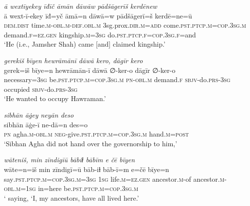 \ea \label{DP.17}
\textit{ā wextīyekey īđīč āmān dāwāw pādšāgerīš kerdēnew} \\ 
\gll ā wext-ī-ekey īđ=yč āmā=n dāwā=w pādšāgerī=š kerdē=ne=ū \\ 
 \textsc{dem.dist} time\textsc{.m}\textsc{-obl}\textsc{.m}\textsc{-def}\textsc{.obl}\textsc{.m} 3sg.prox\textsc{.dir}\textsc{.m}\textsc{=add} come\textsc{.pst}\textsc{.ptcp}\textsc{.m}\textsc{=cop}\textsc{.3sg}\textsc{.m} demand\textsc{\textsc{.f}}\textsc{=ez}\textsc{.gen} kingship\textsc{.m}\textsc{=3sg} do\textsc{.pst}\textsc{.ptcp}\textsc{\textsc{.f}}\textsc{=cop}\textsc{.3sg}\textsc{\textsc{.f}}=and \\ 
\glt `He (i.e., Jamsher Shah) came [and] claimed kingship.'
\z 
 
\ea \label{DP.18}
\textit{gerekiš bīyen hewrāmānī dāwā kero, dāgīr kero} \\ 
\gll gerek=iš bīye=n hewrāmān-ī dāwā ∅-ker-o dāgīr ∅-ker-o \\ 
 necessary\textsc{=3sg} be\textsc{.pst}\textsc{.ptcp}\textsc{.m}\textsc{=cop}\textsc{.3sg}\textsc{.m} \textsc{pn}\textsc{-obl}\textsc{.m} demand\textsc{\textsc{.f}} \textsc{sbjv-}do\textsc{.prs}\textsc{-3sg} occupied \textsc{sbjv-}do\textsc{.prs}\textsc{-3sg} \\ 
\glt `He wanted to occupy Hawraman.'
\z 
 
\ea \label{DP.19}
\textit{sibhān āġey neyān deso} \\ 
\gll sibhān āġe-ī ne-dā=n des=o \\ 
 \textsc{pn} agha\textsc{.m}\textsc{-obl}\textsc{.m} \textsc{neg-}give\textsc{.pst}\textsc{.ptcp}\textsc{.m}\textsc{=cop}\textsc{.3sg}\textsc{.m} hand\textsc{.m}\textsc{=\textsc{post}} \\ 
\glt `Sibhan Agha did not hand over the governorship to him,'
\z 
 
\ea \label{DP.20}
\textit{wāteniš, min zīndigīū bābiɫ bābīm e čē bīyen} \\ 
\gll wāte=n=iš min zīndigī=ū bāb-iɫ bāb-ī=m e=čē bīye=n \\ 
 say\textsc{.pst}\textsc{.ptcp}\textsc{.m}\textsc{=cop}\textsc{.3sg}\textsc{.m}\textsc{=3sg} \textsc{1sg} life\textsc{.m}\textsc{=ez}\textsc{.gen} ancestor\textsc{.m}-of ancestor\textsc{.m}\textsc{-obl}\textsc{.m}\textsc{=1sg} in=here be\textsc{.pst}\textsc{.ptcp}\textsc{.m}\textsc{=cop}\textsc{.3sg}\textsc{.m} \\ 
\glt ` saying, ‘I, my ancestors, have all lived here.'
\z 
 

